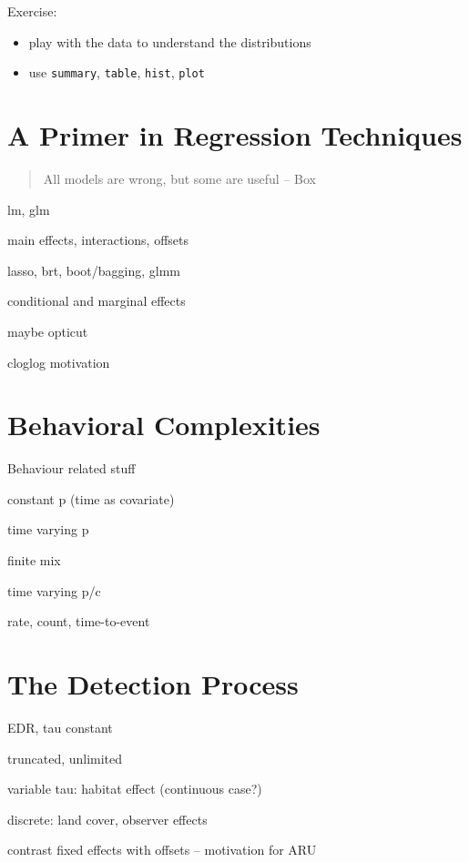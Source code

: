 \documentclass[12pt,]{scrbook}
\providecommand{\tightlist}{%
  \setlength{\itemsep}{0pt}\setlength{\parskip}{0pt}}
\begin{document}
Exercise:

\begin{itemize}
\tightlist
\item
  play with the data to understand the distributions
\item
  use \texttt{summary}, \texttt{table}, \texttt{hist}, \texttt{plot}
\end{itemize}

\hypertarget{regression}{%
\chapter{A Primer in Regression Techniques}\label{regression}}

\begin{quote}
All models are wrong, but some are useful -- Box
\end{quote}

lm, glm

main effects, interactions, offsets

lasso, brt, boot/bagging, glmm

conditional and marginal effects

maybe opticut

cloglog motivation

\hypertarget{behavior}{%
\chapter{Behavioral Complexities}\label{behavior}}

Behaviour related stuff

constant p (time as covariate)

time varying p

finite mix

time varying p/c

rate, count, time-to-event

\hypertarget{detection}{%
\chapter{The Detection Process}\label{detection}}

EDR, tau constant

truncated, unlimited

variable tau: habitat effect (continuous case?)

discrete: land cover, observer effects

contrast fixed effects with offsets -- motivation for ARU
\end{document}
